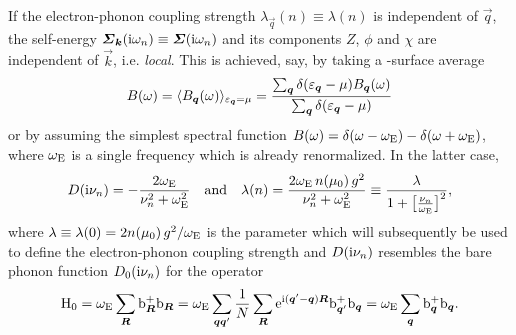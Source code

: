 If the electron-phonon coupling strength $\lambda_{\vec q}(n) \equiv \lambda(n)$
is independent of $\vec q$, the self-energy $\boldsymbol {\varSigma}_{\boldsymbol k}(\mathrm i \omega_n)
\equiv \boldsymbol {\varSigma}(\mathrm i \omega_n)$ and its components $Z$, $\phi$ and $\chi$ are
independent of $\vec k$, i.e. \emph{local}. This is achieved, say, by taking a
-surface average \cite[Eqs.~3.23, 3.24]{AllenMitrovic82}
%
\begin{equation*}
    B(\omega) = \langle B_{\boldsymbol q}(\omega)\rangle_{\varepsilon_{\boldsymbol q} = \mu}
    = \frac
        {\sum_{\boldsymbol q} \delta(\varepsilon_{\boldsymbol q} - \mu) B_{\boldsymbol q}(\omega)}
        {\sum_{\boldsymbol q} \delta(\varepsilon_{\boldsymbol q} - \mu)}
\end{equation*}
%
or by assuming the simplest spectral function $B(\omega) = \delta(\omega -
\omega \sb{\text{E}}) - \delta(\omega + \omega \sb{\text{E}})$, where $\omega \sb{\text{E}}$ is a
single  frequency which is already renormalized. In the latter
case,
%
\begin{equation*}
    D(\mathrm i \nu_n)
    = -\frac{2 \omega \sb{\text{E}}}{\nu_n^2 + \omega^2 \sb{\text{E}}}
    \quad \text{and} \quad
    \lambda(n)
    = \frac{2 \omega \sb{\text{E}} \, n(\mu_0) \, g^2}{\nu_n^2 + \omega^2 \sb{\text{E}}}
    \equiv \frac \lambda {1 + \big[ \frac{\nu_n}{\omega \sb{\text{E}}} \big]^2},
\end{equation*}
%
where $\lambda \equiv \lambda(0) = 2 n(\mu_0) \, g^2 / \omega \sb{\text{E}}$ is the
parameter which will subsequently be used to define the electron-phonon coupling
strength and $D(\mathrm i \nu_n)$ resembles the bare phonon  function
$D_0(\mathrm i \nu_n)$ for the  operator
%
\begin{equation*}
    \mathrm H_0
    = \omega \sb{\text{E}} \sum_{\boldsymbol R} \mathrm b_{\boldsymbol R}^+ \mathrm b_{\boldsymbol R}
    = \omega \sb{\text{E}} \sum_{\boldsymbol q \boldsymbol q'} \frac 1 N \sum_{\boldsymbol R}
        \mathrm e^{\mathrm i (\boldsymbol q' - \boldsymbol q) \boldsymbol R} \mathrm b_{\boldsymbol q'}^+ \mathrm b_{\boldsymbol q}
    = \omega \sb{\text{E}} \sum_{\boldsymbol q} \mathrm b_{\boldsymbol q}^+ \mathrm b_{\boldsymbol q}.
\end{equation*}

